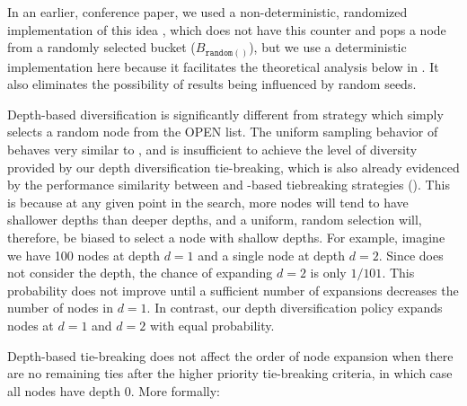 In an earlier, conference paper, we used a non-deterministic,
randomized implementation of this idea \cite{Asai2016}, which does not have this counter and pops a node from a randomly selected bucket ($B_{\texttt{random}()}$), but we use a deterministic
implementation here because it facilitates the theoretical analysis below in . It also eliminates the possibility of results being influenced by random seeds.

Depth-based diversification is significantly different from \ro strategy which simply selects a random node from the OPEN list.
The uniform sampling behavior of  \ro behaves very similar to \fifo, and is insufficient to achieve the level of diversity provided by our depth diversification tie-breaking,
which is also already evidenced by the performance similarity between \fifo and \ro-based tiebreaking strategies ().
This is because at any given point in the search, more nodes will tend to have shallower depths than deeper depths, and a uniform, random selection will, therefore, be biased to select a node with shallow depths.
For example, imagine we have 100 nodes at depth $d=1$ and a single node at depth $d=2$.
Since \ro does not consider the depth, the chance of expanding $d=2$ is only $1/101$.
This probability does not improve until a sufficient number of expansions decreases the number of nodes in $d=1$.
In contrast, our depth diversification policy expands nodes at $d=1$ and $d=2$ with equal probability.




Depth-based tie-breaking does not affect the order of node expansion when there are no remaining ties after the
higher priority tie-breaking criteria, in which case all nodes have depth 0.
More formally:

